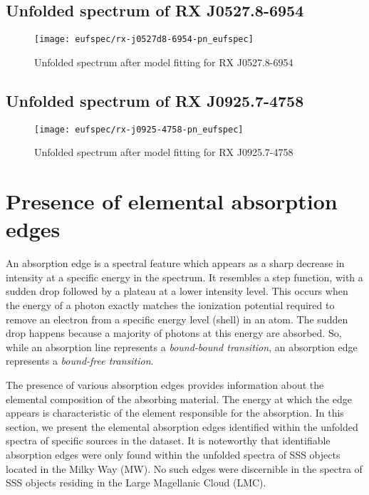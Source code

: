		\subsection*{Unfolded spectrum of RX J0527.8-6954}
			\begin{figure}[h!]
				\centering
				\texttt{[image: eufspec/rx-j0527d8-6954-pn\_eufspec]}
				\caption{Unfolded spectrum after model fitting for RX J0527.8-6954}
				\label{result:euf-rx-j0527}
			\end{figure}
		
		\newpage
		\subsection*{Unfolded spectrum of RX J0925.7-4758}
			\begin{figure}[h!]
				\centering
				\texttt{[image: eufspec/rx-j0925-4758-pn\_eufspec]}
				\caption{Unfolded spectrum after model fitting for RX J0925.7-4758}
				\label{result:euf-rx-j0925}
			\end{figure}
		
	
	\section{Presence of elemental absorption edges}
		An absorption edge is a spectral feature which appears as a sharp decrease in intensity at a specific energy in the spectrum. It resembles a step function, with a sudden drop followed by a plateau at a lower intensity level. This occurs when the energy of a photon exactly matches the ionization potential required to remove an electron from a specific energy level (shell) in an atom. The sudden drop happens because a majority of photons at this energy are absorbed. So, while an absorption line represents a \textit{bound-bound transition}, an absorption edge represents a \textit{bound-free transition}.
		
		The presence of various absorption edges provides information about the elemental composition of the absorbing material. The energy at which the edge appears is characteristic of the element responsible for the absorption. In this section, we present the elemental absorption edges identified within the unfolded spectra of specific sources in the dataset. It is noteworthy that identifiable absorption edges were only found within the unfolded spectra of SSS objects located in the Milky Way (MW). No such edges were discernible in the spectra of SSS objects residing in the Large Magellanic Cloud (LMC).
	
